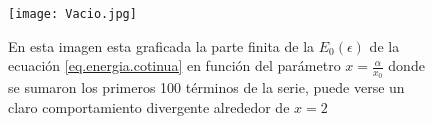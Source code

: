 \begin{figure}
    \centering
    \texttt{[image: Vacio.jpg]}
    \caption{En esta imagen esta graficada la parte finita de la $E _0 (\epsilon) $ de la ecuación \ref{eq.energia.cotinua} en función del parámetro $x= \frac{\alpha}{x _0}$ donde se sumaron los primeros 100 términos de la serie, puede verse un claro comportamiento divergente alrededor de $x=2$}
    \label{fig:vacio}
\end{figure}



